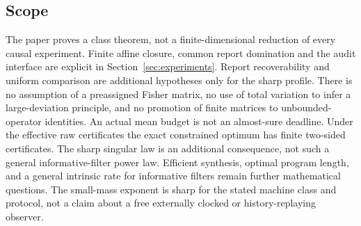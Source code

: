 \subsection*{Scope}
The paper proves a class theorem, not a finite-dimensional reduction of every causal experiment. Finite affine closure, common report domination and the audit interface are explicit in Section~\ref{sec:experiments}. Report recoverability and uniform comparison are additional hypotheses only for the sharp profile. There is no assumption of a preassigned Fisher matrix, no use of total variation to infer a large-deviation principle, and no promotion of finite matrices to unbounded-operator identities. An actual mean budget is not an almost-sure deadline. Under the effective raw certificates the exact constrained optimum has finite two-sided certificates. The sharp singular law is an additional consequence, not such a general informative-filter power law. Efficient synthesis, optimal program length, and a general intrinsic rate for informative filters remain further mathematical questions. The small-mass exponent is sharp for the stated machine class and protocol, not a claim about a free externally clocked or history-replaying observer.
